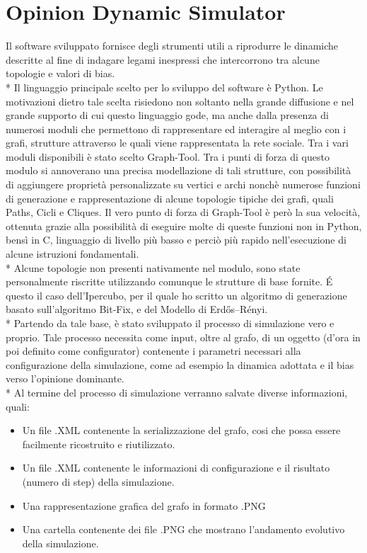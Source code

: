 \documentclass{article}
\begin{document}
\section{Opinion Dynamic Simulator}
Il software sviluppato fornisce degli strumenti utili a riprodurre le dinamiche descritte al fine di indagare legami inespressi che intercorrono tra alcune topologie e valori di bias.\\*
Il linguaggio principale scelto per lo sviluppo del software è Python. Le motivazioni dietro tale scelta risiedono non soltanto nella grande diffusione e nel grande supporto di cui questo linguaggio gode, ma anche dalla presenza di numerosi moduli che permettono di rappresentare ed interagire al meglio con i grafi, strutture attraverso le quali viene rappresentata la rete sociale.
Tra i vari moduli disponibili è stato scelto Graph-Tool. Tra i punti di forza di questo modulo si annoverano una precisa modellazione di tali strutture, con possibilità di aggiungere proprietà personalizzate su vertici e archi nonchè numerose funzioni di generazione e rappresentazione di alcune topologie tipiche dei grafi, quali Paths, Cicli e Cliques. Il vero punto di forza di Graph-Tool è però la sua velocità, ottenuta grazie alla possibilità di eseguire molte di queste funzioni non in Python, bensì in C, linguaggio di livello più basso e perciò più rapido nell'esecuzione di alcune istruzioni fondamentali.\\*
Alcune topologie non presenti nativamente nel modulo, sono state personalmente riscritte utilizzando comunque le strutture di base fornite. É questo il caso dell'Ipercubo, per il quale ho scritto un algoritmo di generazione basato sull'algoritmo Bit-Fix, e del Modello di Erdős–Rényi.\\*
Partendo da tale base, è stato sviluppato il processo di simulazione vero e proprio. Tale processo necessita come input, oltre al grafo, di un oggetto (d'ora in poi definito come configurator) contenente i parametri necessari alla configurazione della simulazione, come ad esempio la dinamica adottata e il bias verso l'opinione dominante.\\* 
Al termine del processo di simulazione verranno salvate diverse informazioni, quali:
\begin{itemize}
\item Un file .XML contenente la serializzazione del grafo, cosi che possa essere facilmente ricostruito e riutilizzato.
\item Un file .XML contenente le informazioni di configurazione e il risultato (numero di step) della simulazione.
\item Una rappresentazione grafica del grafo in formato .PNG
\item Una cartella contenente dei file .PNG che mostrano l'andamento evolutivo della simulazione.
\end{itemize}
\end{document}
